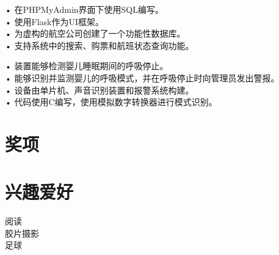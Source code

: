 \documentclass[]{deedy-resume-openfont}
\begin{document}
\begin{minipage}[t]{0.66\textwidth}
• 在PHPMyAdmin界面下使用SQL编写。\\
• 使用Flask作为UI框架。\\
• 为虚构的航空公司创建了一个功能性数据库。\\
• 支持系统中的搜索、购票和航班状态查询功能。\\
\sectionsep

• 装置能够检测婴儿睡眠期间的呼吸停止。\\
• 能够识别并监测婴儿的呼吸模式，并在呼吸停止时向管理员发出警报。\\
• 设备由单片机、声音识别装置和报警系统构建。\\
• 代码使用C编写，使用模拟数字转换器进行模式识别。\\
\sectionsep


\section{奖项}

\descript{}
\vspace{\topsep} %
\sectionsep

\vspace{\topsep} %
\sectionsep


\section{兴趣爱好} 

\textbullet{} 阅读\\
\textbullet{} 胶片摄影\\
\textbullet{} 足球\\
\sectionsep

\end{minipage} 
\end{document}
